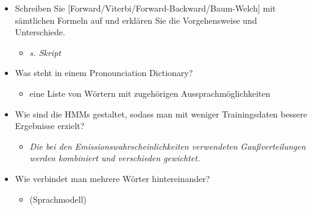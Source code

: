 \documentclass[11pt]{article}
\begin{document}
\begin{itemize}
\begin{itemize}
\end{itemize}
\item Schreiben Sie [Forward/Viterbi/Forward-Backward/Baum-Welch] mit sämtlichen Formeln auf und erklären Sie die Vorgehensweise und Unterschiede.
\begin{itemize}
\item \emph{s. Skript}
\end{itemize}
\item Was steht in einem Pronounciation Dictionary?
\begin{itemize}
\item eine Liste von Wörtern mit zugehörigen Aussprachmöglichkeiten
\end{itemize}
\item Wie sind die HMMs gestaltet, sodass man mit weniger Trainingsdaten bessere Ergebnisse erzielt?
\begin{itemize}
\item \emph{Die bei den Emissionswahrscheinlichkeiten verwendeten Gaußverteilungen werden kombiniert und verschieden gewichtet.}
\end{itemize}
\item Wie verbindet man mehrere Wörter hintereinander?
\begin{itemize}
\item (Sprachmodell)
\end{itemize}
\end{itemize}
\end{document}
